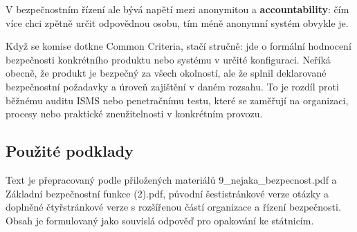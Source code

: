 V bezpečnostním řízení ale bývá napětí mezi anonymitou a \textbf{accountability}: čím více chci zpětně určit odpovědnou osobu, tím méně anonymní systém obvykle je.

Když se komise dotkne Common Criteria, stačí stručně: jde o formální hodnocení bezpečnosti konkrétního produktu nebo systému v určité konfiguraci. Neříká obecně, že produkt je bezpečný za všech okolností, ale že splnil deklarované bezpečnostní požadavky a úroveň zajištění v daném rozsahu. To je rozdíl proti běžnému auditu ISMS nebo penetračnímu testu, které se zaměřují na organizaci, procesy nebo praktické zneužitelnosti v konkrétním provozu.

\subsection*{Použité podklady}

Text je přepracovaný podle přiložených materiálů 9\_nejaka\_bezpecnost.pdf a Základní bezpečnostní funkce (2).pdf, původní šestistránkové verze otázky a doplněné čtyřstránkové verze s rozšířenou částí organizace a řízení bezpečnosti. Obsah je formulovaný jako souvislá odpověď pro opakování ke státnicím.

\newpage

